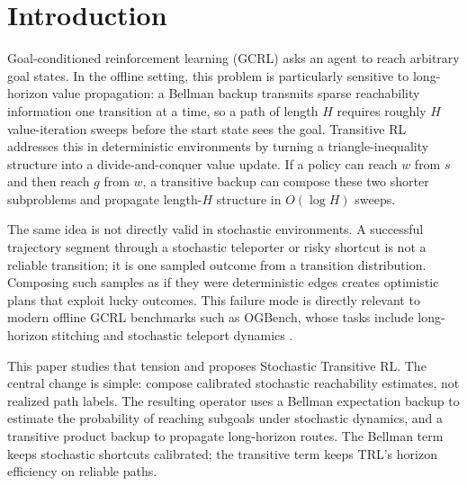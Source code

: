 \documentclass[10pt]{article}
\begin{document}
\section{Introduction}

Goal-conditioned reinforcement learning (GCRL) asks an agent to reach arbitrary
goal states. In the offline setting, this problem is particularly sensitive to
long-horizon value propagation: a Bellman backup transmits sparse reachability
information one transition at a time, so a path of length $H$ requires roughly
$H$ value-iteration sweeps before the start state sees the goal. Transitive RL
\citep{park2026transitive} addresses this in deterministic environments by
turning a triangle-inequality structure into a divide-and-conquer value update.
If a policy can reach $w$ from $s$ and then reach $g$ from $w$, a transitive
backup can compose these two shorter subproblems and propagate length-$H$
structure in $O(\log H)$ sweeps.

The same idea is not directly valid in stochastic environments. A successful
trajectory segment through a stochastic teleporter or risky shortcut is not a
reliable transition; it is one sampled outcome from a transition distribution.
Composing such samples as if they were deterministic edges creates optimistic
plans that exploit lucky outcomes. This failure mode is directly relevant to
modern offline GCRL benchmarks such as OGBench, whose tasks include
long-horizon stitching and stochastic teleport dynamics \citep{park2024ogbench}.

This paper studies that tension and proposes Stochastic Transitive RL. The
central change is simple: compose calibrated stochastic reachability estimates,
not realized path labels. The resulting operator uses a Bellman expectation
backup to estimate the probability of reaching subgoals under stochastic
dynamics, and a transitive product backup to propagate long-horizon routes.
The Bellman term keeps stochastic shortcuts calibrated; the transitive term
keeps TRL's horizon efficiency on reliable paths.
\end{document}
